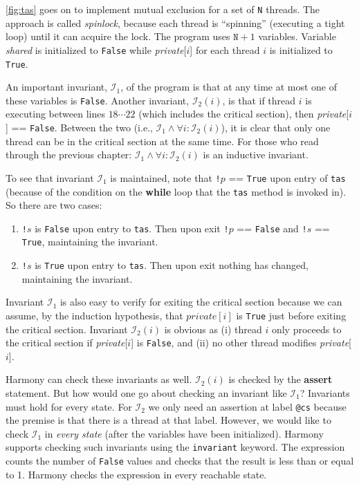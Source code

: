 \documentclass{report}
\begin{document}
\autoref{fig:tas} goes on to implement mutual exclusion for
a set of \texttt{N} threads.
The approach is called \emph{spinlock},
%
because each thread is ``spinning'' (executing a tight loop) until
it can acquire the lock.
The program uses $\mathtt{N}+1$ variables.
Variable \textit{shared} is initialized to \texttt{False} while
\textit{private}[$i$] for each thread $i$ is initialized to \texttt{True}.

An important invariant, $\mathcal{I}_1$, of the program is that at any time at most
one of these variables is \texttt{False}.
Another invariant, $\mathcal{I}_2(i)$, is that if thread $i$ is executing between
lines $18 \cdots 22$ (which includes the critical section),
then \textit{private}[$i$] == \texttt{False}.
Between the two (i.e., $\mathcal{I}_1 \land \forall i: \mathcal{I}_2(i)$),
it is clear that only one thread can be in the
critical section at the same time.
For those who read through the previous chapter:
$\mathcal{I}_1 \land \forall i: \mathcal{I}_2(i)$ is an inductive invariant.

To see that invariant $\mathcal{I}_1$ is maintained, note that
\texttt{!}$p$ == \texttt{True} upon entry of \texttt{tas}
(because of the condition on the \textbf{while} loop that the
\texttt{tas} method is invoked in).
So there are two cases:
\begin{enumerate}
\item \texttt{!}$s$ is \texttt{False} upon entry to \texttt{tas}.
Then upon exit \texttt{!}$p$ == \texttt{False} and \texttt{!}$s$ == \texttt{True},
maintaining the invariant.
\item \texttt{!}$s$ is \texttt{True} upon entry to \texttt{tas}.
Then upon exit nothing has changed, maintaining the invariant.
\end{enumerate}
Invariant $\mathcal{I}_1$ is also easy to verify for exiting the critical section
because we can assume, by the induction hypothesis, that $\textit{private}[i]$ is
\texttt{True} just before exiting the critical section.
Invariant $\mathcal{I}_2(i)$ is obvious as (i) thread $i$ only proceeds to the critical
section if \textit{private}[$i$] is \texttt{False}, and (ii) no other thread modifies
\textit{private}[$i$].

Harmony can check these invariants as well.
$\mathcal{I}_2(i)$ is checked by the \textbf{assert} statement.
But how would one go about checking an
invariant like $\mathcal{I}_1$?  Invariants must hold for every state.
For $\mathcal{I}_2$ we only need an assertion at label \texttt{@cs} because the
premise is that there is a thread at that label.  However, we would
like to check $\mathcal{I}_1$ in \emph{every state} (after the variables have
been initialized).
Harmony supports checking such invariants using the \texttt{invariant}
keyword.
The expression counts the number of \texttt{False} values and checks that
the result is less than or equal to 1.
Harmony checks the expression in every reachable state.
\end{document}

